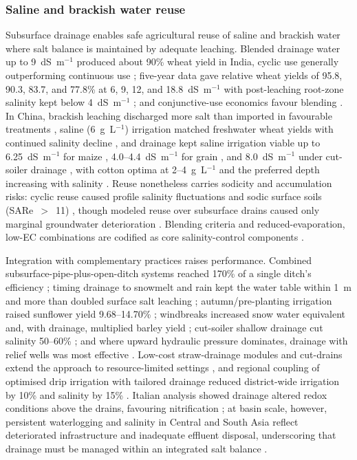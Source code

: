 \subsubsection{Saline and brackish water reuse}

Subsurface drainage enables safe agricultural reuse of saline and brackish water
where salt balance is maintained by adequate leaching. Blended drainage water up
to 9~dS~m$^{-1}$ produced about 90\% wheat yield in India, cyclic use generally
outperforming continuous use \parencite{Sharma2004}; five-year data gave relative
wheat yields of 95.8, 90.3, 83.7, and 77.8\% at 6, 9, 12, and 18.8~dS~m$^{-1}$
with post-leaching root-zone salinity kept below 4~dS~m$^{-1}$
\parencite{Sharma1998}; and conjunctive-use economics favour blending
\parencite{AGNIHOTRI1992}. In China, brackish leaching discharged more salt than
imported in favourable treatments \parencite{Li2023}, saline (6~g~L$^{-1}$)
irrigation matched freshwater wheat yields with continued salinity decline
\parencite{Gao2023}, and drainage kept saline irrigation viable up to
6.25~dS~m$^{-1}$ for maize \parencite{Feng2017}, 4.0--4.4~dS~m$^{-1}$ for grain
\parencite{Feng2021}, and 8.0~dS~m$^{-1}$ under cut-soiler drainage
\parencite{Neha2022}, with cotton optima at 2--4~g~L$^{-1}$ and the preferred
depth increasing with salinity \parencite{Li2024,Lu2019}. Reuse nonetheless
carries sodicity and accumulation risks: cyclic reuse caused profile salinity
fluctuations and sodic surface soils (SARe~$>$~11)
\parencite{Mitchell2000,Jayawardane2001}, though modeled reuse over subsurface
drains caused only marginal groundwater deterioration \parencite{KARAJEH1994c}.
Blending criteria and reduced-evaporation, low-EC combinations are codified as
core salinity-control components \parencite{Kotb2000,Cuevas2019}.

Integration with complementary practices raises performance. Combined
subsurface-pipe-plus-open-ditch systems reached 170\% of a single ditch's
efficiency \parencite{Yao2024}; timing drainage to snowmelt and rain kept the
water table within 1~m and more than doubled surface salt leaching
\parencite{Yu2016}; autumn/pre-planting irrigation raised sunflower yield
9.68--14.70\% \parencite{Liu2023,Liu2025c}; windbreaks increased snow water
equivalent and, with drainage, multiplied barley yield
\parencite{Steppuhn2006,Steppuhn2017}; cut-soiler shallow drainage cut salinity
50--60\% \parencite{Neha2022,Neha2022b}; and where upward hydraulic pressure
dominates, drainage with relief wells was most effective
\parencite{Benyamini2005,Mirlas2003}. Low-cost straw-drainage modules and
cut-drains extend the approach to resource-limited settings
\parencite{Lu2019,Okuda2020}, and regional coupling of optimised drip irrigation
with tailored drainage reduced district-wide irrigation by 10\% and salinity by
15\% \parencite{Liu2026}. Italian analysis showed drainage altered redox
conditions above the drains, favouring nitrification \parencite{Mastrocicco2013};
at basin scale, however, persistent waterlogging and salinity in Central and
South Asia reflect deteriorated infrastructure and inadequate effluent disposal,
underscoring that drainage must be managed within an integrated salt balance
\parencite{Dukhovny2007,Qureshi2008,Ritzema2016,SKAGGS1994}.

